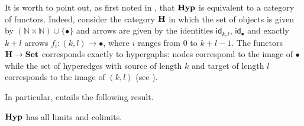 \documentclass[a4paper,UKenglish,cleveref,pdftex,thm-restate,numberwithinsect]{lipics-v2021}
\newcommand{\Set}{\mathbf{Set}}
\newcommand{\catname}[1]{\textbf{\textup{#1}}}
\newcommand{\hyp}{\catname{Hyp}}
\newcommand{\id}[1]{\mathsf{id}_{#1}}
\begin{document}
\iffalse
\begin{example}\label[example]{exa_2}
	Let $V_\mathcal{G} = \{v_1, v_2, v_3, v_4, v_5\}$, and $E_\mathcal{G} = \{h_1, h_2, h_3, h_4\}$. Then we define:
	\[\begin{matrix}
		s_{\mathcal{G}}(h_1)\colon 0\to V_{\mathcal{G}} & s_{\mathcal{G}}(h_1)=?_{V_\mathcal{G}} &&
		s_{\mathcal{G}}(h_2)\colon 0\to V_{\mathcal{G}} & s_{\mathcal{G}}(h_2)=?_{V_\mathcal{G}} &&
		s_{\mathcal{G}}(h_3)\colon 2\to V_{\mathcal{G}} & \begin{matrix} 
					0 \mapsto v_1\\
					1\mapsto v_4
				\end{matrix}&&
		s_{\mathcal{G}}(h_4)\colon 2 \to V_\mathcal{G} & \begin{matrix}
					0 \mapsto v_3 \\
					1\mapsto v_2 
				\end{matrix}\\

		t_{\mathcal{G}}(h_1)\colon 1\to V_{\mathcal{G}} & 0 \mapsto v_1 &&
		t_{\mathcal{G}}(h_2)\colon 1\to V_{\mathcal{G}} & 0\mapsto v_3 &&
		t_{\mathcal{G}}(h_3)\colon 1\to V_{\mathcal{G}} & 1\mapsto v_5 &&
		t_\mathcal{G}(h_4)\colon 1 \to V_\mathcal{G} & 0 \mapsto v_4
	\end{matrix}\]
\end{example}
\fi

\begin{remark}\label{rem:functor}
	It is worth to point out, as first noted in \cite{bonchi2022string}, that $\hyp$ is equivalent to a category of functors. 
	Indeed, consider the category $\catname{H}$ in which the set of objects is given by $ (\mathbb{N}\times \mathbb{N}) \cup \{\bullet\}$ and arrows are given by the identities $\id{k,l}$, $\id{\bullet}$ and exactly $k+l$ arrows $f_i\colon (k,l)\rightarrow \bullet$, where $i$ ranges from $0$ to $k+l-1$. 
	The functors $\catname{H}\to \Set$ corresponds exactly to hypergaphs: nodes correspond to the image of $\bullet$ while the set of hyperedges with source of length $k$ and target of length $l$ corresponds to the image of $(k,l)$ (see \cite{CastelnovoGM24}).
\end{remark}

In particular,  entails the following result. 

\begin{proposition}\label{prop:cocomp}
	$\hyp$ has all limits and colimits.
\end{proposition}
\end{document}
